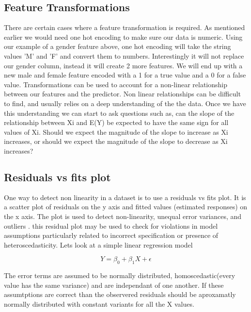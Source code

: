 \subsection{Feature Transformations}

There are certain cases where a feature transformation is required. As mentioned earlier we would need one hot encoding to make sure our data is numeric. Using our example of a gender feature above, one hot encoding will take the string values 'M' and 'F' and convert them to numbers. Interestingly it will not replace our gender column, instead it will create 2 more features. We will end up with a new male and female feature encoded with a 1 for a true value and a 0 for a false value.
Transformations can be used to account for a non-linear relationship between our features and the predictor. Non linear relationships can be difficult to find, and usually relies on a deep understanding of the the data. Once we have this understanding we can start to ask questions such as, can the slope of
the relationship between Xi and E(Y) be expected to have the same sign for all values of Xi. Should we expect the magnitude of the slope to increase as Xi increases, or should we expect
the magnitude of the slope to decrease as Xi increases?\cite{nonlinearRelationships}

\subsection{Residuals vs fits plot}

One way to detect non linearity in a dataset is to use a residuals vs fits plot. It is a scatter plot of residuals on the y axis and fitted values (estimated responses) on the x axis. The plot is used to detect non-linearity, unequal error variances, and outliers \cite{residualsVsFitsPlot}. this residual plot may be used to check for violations in model assumptions particularly related to incorrect specification or presence of heteroscedasticity\cite{doi:10.1002/9781118625590.ch2}. Lets look at a simple linear regression model

\[ Y = \beta_0 + \beta_1X + \epsilon \]

The error terms are assumed to be normally distributed, homoscedastic(every value has the same variance) and are  independant of one another. If these assumtptions are correct than the observered residuals should be aproxamatly normally distributed with constant variants for all the X values.


